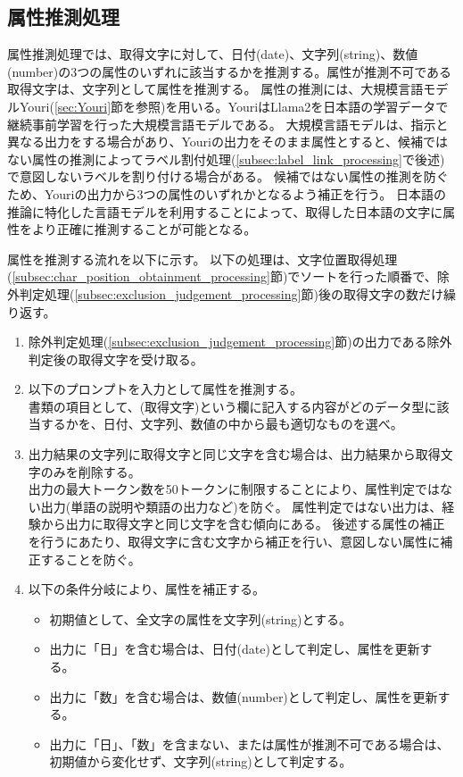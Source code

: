\subsection{属性推測処理}\label{subsec:att_prediction_processing}
属性推測処理では、取得文字に対して、日付(date)、文字列(string)、数値(number)の3つの属性のいずれに該当するかを推測する。属性が推測不可である取得文字は、文字列として属性を推測する。
属性の推測には、大規模言語モデルYouri(\ref{sec:Youri}節を参照)を用いる。YouriはLlama2を日本語の学習データで継続事前学習を行った大規模言語モデルである。
大規模言語モデルは、指示と異なる出力をする場合があり、Youriの出力をそのまま属性とすると、候補ではない属性の推測によってラベル割付処理(\ref{subsec:label_link_processing}で後述)で意図しないラベルを割り付ける場合がある。
候補ではない属性の推測を防ぐため、Youriの出力から3つの属性のいずれかとなるよう補正を行う。
日本語の推論に特化した言語モデルを利用することによって、取得した日本語の文字に属性をより正確に推測することが可能となる。

属性を推測する流れを以下に示す。
以下の処理は、文字位置取得処理(\ref{subsec:char_position_obtainment_processing}節)でソートを行った順番で、除外判定処理(\ref{subsec:exclusion_judgement_processing}節)後の取得文字の数だけ繰り返す。

\begin{enumerate}
    \item 除外判定処理(\ref{subsec:exclusion_judgement_processing}節)の出力である除外判定後の取得文字を受け取る。
    \item 以下のプロンプトを入力として属性を推測する。\\
        書類の項目として、(取得文字)という欄に記入する内容がどのデータ型に該当するかを、日付、文字列、数値の中から最も適切なものを選べ。
    \item 出力結果の文字列に取得文字と同じ文字を含む場合は、出力結果から取得文字のみを削除する。\\
        出力の最大トークン数を50トークンに制限することにより、属性判定ではない出力(単語の説明や類語の出力など)を防ぐ。
        属性判定ではない出力は、経験から出力に取得文字と同じ文字を含む傾向にある。
        後述する属性の補正を行うにあたり、取得文字に含む文字から補正を行い、意図しない属性に補正することを防ぐ。
    \item 以下の条件分岐により、属性を補正する。
        \begin{itemize}
            \item 初期値として、全文字の属性を文字列(string)とする。
            \item 出力に「日」を含む場合は、日付(date)として判定し、属性を更新する。
            \item 出力に「数」を含む場合は、数値(number)として判定し、属性を更新する。
            \item 出力に「日」、「数」を含まない、または属性が推測不可である場合は、初期値から変化せず、文字列(string)として判定する。
        \end{itemize}
\end{enumerate}



